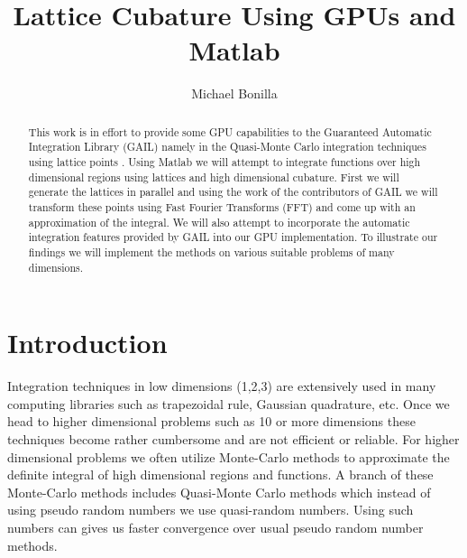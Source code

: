 \documentclass[12pt,letterpaper]{article}
\author{Michael Bonilla}
\title{Lattice Cubature Using GPUs and Matlab}
\begin{document}
\maketitle
\begin{abstract}
This work is in effort to provide some GPU capabilities to the Guaranteed Automatic Integration Library (GAIL)\cite{GAIL} namely in the Quasi-Monte Carlo integration techniques using lattice points \cite{toni}. Using Matlab we will attempt to integrate functions over high dimensional regions using lattices and high dimensional cubature. First we will generate the lattices in parallel and using the work of the contributors of GAIL we will transform these points using Fast Fourier Transforms (FFT) and come up with an approximation of the integral. We will also attempt to incorporate the automatic integration features provided by GAIL into our GPU implementation. To illustrate our findings we will implement the methods on various suitable problems of many dimensions.
\end{abstract}
\section{Introduction}
Integration techniques in low dimensions (1,2,3) are extensively used in many computing libraries such as trapezoidal rule, Gaussian quadrature, etc. Once we head to higher dimensional problems such as 10 or more dimensions these techniques become rather cumbersome and are not efficient or reliable. For higher dimensional problems we often utilize Monte-Carlo methods to approximate the definite integral of high dimensional regions and functions. A branch of these Monte-Carlo methods includes Quasi-Monte Carlo methods which instead of using pseudo random numbers we use quasi-random numbers. Using such numbers can gives us faster convergence over usual pseudo random number methods. 
\end{document}
